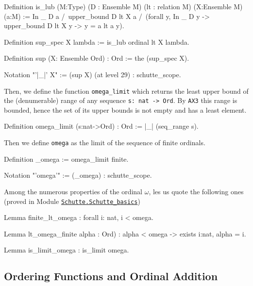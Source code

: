 {\begin{Coqsrc}
Definition is_lub (M:Type)
                  (D : Ensemble M)
                  (lt : relation M)
                  (X:Ensemble M)
                  (a:M) :=
   In _ D a  /\ upper_bound  D lt X a  /\
   (forall y, In _ D y -> upper_bound  D lt X y  -> 
                  y = a \/ lt a y).
\end{Coqsrc}


\begin{Coqsrc}
Definition sup_spec X lambda := is_lub ordinal lt X lambda.

Definition sup (X: Ensemble Ord) : Ord  := the  (sup_spec X).

Notation "'|_|' X" := (sup X) (at level 29) : schutte_scope.
\end{Coqsrc}



Then, we define the function \texttt{omega\_limit} which returns the least upper bound 
of the  (denumerable) range of any sequence \texttt{s: nat -> Ord}. 
By \texttt{AX3} this range is bounded, hence the set of its upper bounds is not empty and has a least element.


\begin{Coqsrc}
Definition omega_limit (s:nat->Ord) : Ord 
  := |_| (seq_range s).
\end{Coqsrc}

Then we define \texttt{omega} as the limit of the sequence of finite ordinals.


\label{sect:notation-omega}
\begin{Coqsrc}
Definition _omega := omega_limit finite.

Notation "'omega'" := (_omega) : schutte_scope.
\end{Coqsrc}



Among the numerous properties of the ordinal $\omega$, les us quote the following ones
(proved in Module 
\href{../theories/html/hydras.Schutte.Schutte_basics.html\#finite_lt_omega}{\texttt{Schutte.Schutte\_basics}})

\begin{Coqsrc}
Lemma finite_lt_omega : forall i: nat,  i < omega.

Lemma lt_omega_finite alpha : Ord) : 
  alpha < omega ->  exists i:nat, alpha =  i.

Lemma is_limit_omega : is_limit omega.
\end{Coqsrc}


\subsection{Ordering Functions and Ordinal Addition}

}
